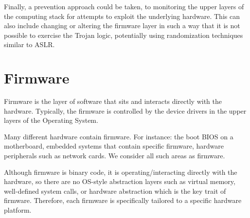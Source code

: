 \documentclass[11pt,letterpaper]{article}
\begin{document}
Finally, a prevention approach could be taken, to monitoring the upper
layers of the computing stack for attempts to exploit the underlying
hardware. This can also include changing or altering the firmware
layer in such a way that it is not possible to exercise the Trojan
logic, potentially using randomization techniques similar to ASLR. 

\section{Firmware}



Firmware is the layer of software that sits and interacts directly
with the hardware. Typically, the firmware is controlled by the
device drivers in the upper layers of the Operating System.


Many different hardware contain firmware. For instance: the boot BIOS
on a motherboard, embedded systems that contain
specific firmware, hardware peripherals such as network cards. 
We consider all such areas as firmware.


Although firmware is binary code, it is
operating/interacting directly with the hardware, so there are no
OS-style abstraction layers such as virtual memory, well-defined
system calls, or hardware abstraction which is the key trait of firmware. 
Therefore, each firmware is specifically tailored to a specific hardware platform.
\end{document}
